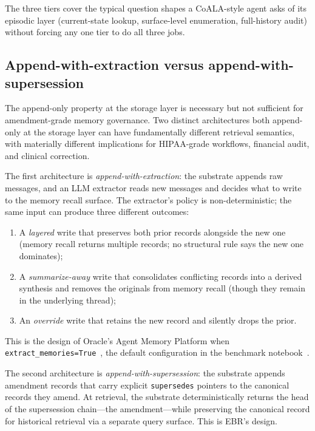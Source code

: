 \documentclass[11pt,a4paper]{article}
\begin{document}
\noindent
The three tiers cover the typical question shapes a CoALA-style agent asks of its
episodic layer (current-state lookup, surface-level enumeration, full-history audit)
without forcing any one tier to do all three jobs.

\subsection{Append-with-extraction versus append-with-supersession}
\label{sec:append-vs-supersession}

\noindent
The append-only property at the storage layer is necessary but not
sufficient for amendment-grade memory governance. Two distinct
architectures both append-only at the storage layer can have
fundamentally different retrieval semantics, with materially different
implications for HIPAA-grade workflows, financial audit, and clinical
correction.

The first architecture is \emph{append-with-extraction}: the substrate
appends raw messages, and an LLM extractor reads new messages and
decides what to write to the memory recall surface. The extractor's
policy is non-deterministic; the same input can produce three different
outcomes:

\begin{enumerate}
  \item A \emph{layered} write that preserves both prior records
        alongside the new one (memory recall returns multiple records;
        no structural rule says the new one dominates);
  \item A \emph{summarize-away} write that consolidates conflicting
        records into a derived synthesis and removes the originals from
        memory recall (though they remain in the underlying thread);
  \item An \emph{override} write that retains the new record and
        silently drops the prior.
\end{enumerate}

\noindent
This is the design of Oracle's Agent Memory Platform when
\texttt{extract\_memories=True}~\cite{oracleOAMP2026}, the default
configuration in the benchmark notebook~\cite{oracleAgentMemoryBenchmarks2026}.

The second architecture is \emph{append-with-supersession}: the substrate
appends amendment records that carry explicit \texttt{supersedes}
pointers to the canonical records they amend. At retrieval, the substrate
deterministically returns the head of the supersession
chain---the amendment---while preserving the canonical record for
historical retrieval via a separate query surface. This is EBR's design.
\end{document}
